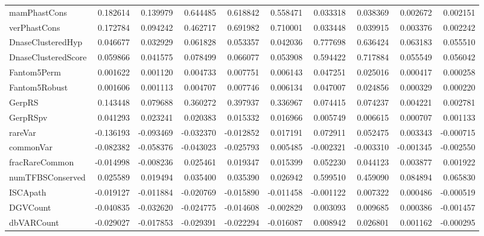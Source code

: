 \begin{tabular}{lrrrrrrrrr}
mamPhastCons        &   0.182614 &   0.139979 &      0.644485 &      0.618842 &      0.558471 &           0.033318 &             0.038369 &     0.002672 &       0.002151 \\
verPhastCons        &   0.172784 &   0.094242 &      0.462717 &      0.691982 &      0.710001 &           0.033448 &             0.039915 &     0.003376 &       0.002242 \\
DnaseClusteredHyp   &   0.046677 &   0.032929 &      0.061828 &      0.053357 &      0.042036 &           0.777698 &             0.636424 &     0.063183 &       0.055510 \\
DnaseClusteredScore &   0.059866 &   0.041575 &      0.078499 &      0.066077 &      0.053908 &           0.594422 &             0.717884 &     0.055549 &       0.056042 \\
Fantom5Perm         &   0.001622 &   0.001120 &      0.004733 &      0.007751 &      0.006143 &           0.047251 &             0.025016 &     0.000417 &       0.000258 \\
Fantom5Robust       &   0.001606 &   0.001113 &      0.004707 &      0.007746 &      0.006134 &           0.047007 &             0.024856 &     0.000329 &       0.000220 \\
GerpRS              &   0.143448 &   0.079688 &      0.360272 &      0.397937 &      0.336967 &           0.074415 &             0.074237 &     0.004221 &       0.002781 \\
GerpRSpv            &   0.041293 &   0.023241 &      0.020383 &      0.015332 &      0.016966 &           0.005749 &             0.006615 &     0.000707 &       0.001133 \\
rareVar             &  -0.136193 &  -0.093469 &     -0.032370 &     -0.012852 &      0.017191 &           0.072911 &             0.052475 &     0.003343 &      -0.000715 \\
commonVar           &  -0.082382 &  -0.058376 &     -0.043023 &     -0.025793 &      0.005485 &          -0.002321 &            -0.003310 &    -0.001345 &      -0.002550 \\
fracRareCommon      &  -0.014998 &  -0.008236 &      0.025461 &      0.019347 &      0.015399 &           0.052230 &             0.044123 &     0.003877 &       0.001922 \\
numTFBSConserved    &   0.025589 &   0.019494 &      0.035400 &      0.035390 &      0.026942 &           0.599510 &             0.459090 &     0.084894 &       0.065830 \\
ISCApath            &  -0.019127 &  -0.011884 &     -0.020769 &     -0.015890 &     -0.011458 &          -0.001122 &             0.007322 &     0.000486 &      -0.000519 \\
DGVCount            &  -0.040835 &  -0.032620 &     -0.024775 &     -0.014608 &     -0.002829 &           0.003093 &             0.009685 &     0.000386 &      -0.001457 \\
dbVARCount          &  -0.029027 &  -0.017853 &     -0.029391 &     -0.022294 &     -0.016087 &           0.008942 &             0.026801 &     0.001162 &      -0.000295 \\
\bottomrule
\end{tabular}
